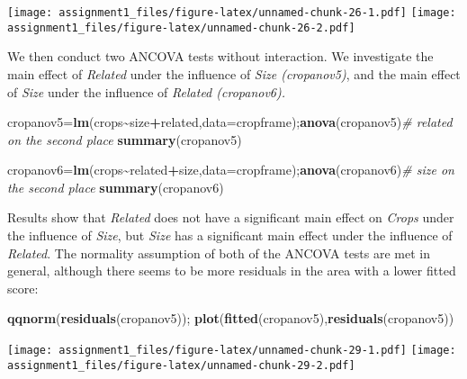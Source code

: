 \documentclass[
]{article}
\newenvironment{Shaded}{\begin{snugshade}}{\end{snugshade}}
\newcommand{\AttributeTok}[1]{\textcolor[rgb]{0.13,0.29,0.53}{#1}}
\newcommand{\CommentTok}[1]{\textcolor[rgb]{0.56,0.35,0.01}{\textit{#1}}}
\newcommand{\FunctionTok}[1]{\textcolor[rgb]{0.13,0.29,0.53}{\textbf{#1}}}
\newcommand{\NormalTok}[1]{#1}
\newcommand{\OtherTok}[1]{\textcolor[rgb]{0.56,0.35,0.01}{#1}}
\newcommand{\SpecialCharTok}[1]{\textcolor[rgb]{0.81,0.36,0.00}{\textbf{#1}}}
\begin{document}
\texttt{[image: assignment1\_files/figure-latex/unnamed-chunk-26-1.pdf]}
\texttt{[image: assignment1\_files/figure-latex/unnamed-chunk-26-2.pdf]}

We then conduct two ANCOVA tests without interaction. We investigate the
main effect of \emph{Related} under the influence of \emph{Size
(cropanov5)}, and the main effect of \emph{Size} under the influence of
\emph{Related (cropanov6).}

\begin{Shaded}
\begin{Highlighting}[]
\NormalTok{cropanov5}\OtherTok{=}\FunctionTok{lm}\NormalTok{(crops}\SpecialCharTok{\textasciitilde{}}\NormalTok{size}\SpecialCharTok{+}\NormalTok{related,}\AttributeTok{data=}\NormalTok{cropframe);}\FunctionTok{anova}\NormalTok{(cropanov5)}\CommentTok{\# related on the second place}
\FunctionTok{summary}\NormalTok{(cropanov5)}
\end{Highlighting}
\end{Shaded}

\begin{Shaded}
\begin{Highlighting}[]
\NormalTok{cropanov6}\OtherTok{=}\FunctionTok{lm}\NormalTok{(crops}\SpecialCharTok{\textasciitilde{}}\NormalTok{related}\SpecialCharTok{+}\NormalTok{size,}\AttributeTok{data=}\NormalTok{cropframe);}\FunctionTok{anova}\NormalTok{(cropanov6)}\CommentTok{\# size on the second place}
\FunctionTok{summary}\NormalTok{(cropanov6)}
\end{Highlighting}
\end{Shaded}

Results show that \emph{Related} does not have a significant main effect
on \emph{Crops} under the influence of \emph{Size}, but \emph{Size} has
a significant main effect under the influence of \emph{Related}. The
normality assumption of both of the ANCOVA tests are met in general,
although there seems to be more residuals in the area with a lower
fitted score:

\begin{Shaded}
\begin{Highlighting}[]
\FunctionTok{qqnorm}\NormalTok{(}\FunctionTok{residuals}\NormalTok{(cropanov5)); }\FunctionTok{plot}\NormalTok{(}\FunctionTok{fitted}\NormalTok{(cropanov5),}\FunctionTok{residuals}\NormalTok{(cropanov5))}
\end{Highlighting}
\end{Shaded}

\texttt{[image: assignment1\_files/figure-latex/unnamed-chunk-29-1.pdf]}
\texttt{[image: assignment1\_files/figure-latex/unnamed-chunk-29-2.pdf]}
\end{document}
